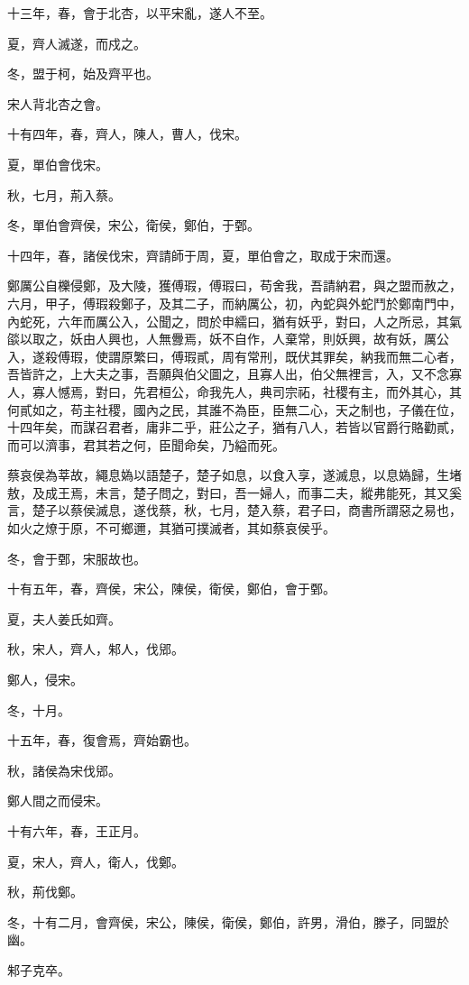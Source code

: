 \begin{pinyinscope}
十三年，春，會于北杏，以平宋亂，遂人不至。

夏，齊人滅遂，而戍之。

冬，盟于柯，始及齊平也。

宋人背北杏之會。

十有四年，春，齊人，陳人，曹人，伐宋。

夏，單伯會伐宋。

秋，七月，荊入蔡。

冬，單伯會齊侯，宋公，衛侯，鄭伯，于鄄。

十四年，春，諸侯伐宋，齊請師于周，夏，單伯會之，取成于宋而還。

鄭厲公自櫟侵鄭，及大陵，獲傅瑕，傅瑕曰，苟舍我，吾請納君，與之盟而赦之，六月，甲子，傅瑕殺鄭子，及其二子，而納厲公，初，內蛇與外蛇鬥於鄭南門中，內蛇死，六年而厲公入，公聞之，問於申繻曰，猶有妖乎，對曰，人之所忌，其氣燄以取之，妖由人興也，人無釁焉，妖不自作，人棄常，則妖興，故有妖，厲公入，遂殺傅瑕，使謂原繁曰，傅瑕貳，周有常刑，既伏其罪矣，納我而無二心者，吾皆許之，上大夫之事，吾願與伯父圖之，且寡人出，伯父無裡言，入，又不念寡人，寡人憾焉，對曰，先君桓公，命我先人，典司宗祏，社稷有主，而外其心，其何貳如之，苟主社稷，國內之民，其誰不為臣，臣無二心，天之制也，子儀在位，十四年矣，而謀召君者，庸非二乎，莊公之子，猶有八人，若皆以官爵行賂勸貳，而可以濟事，君其若之何，臣聞命矣，乃縊而死。

蔡哀侯為莘故，繩息媯以語楚子，楚子如息，以食入享，遂滅息，以息媯歸，生堵敖，及成王焉，未言，楚子問之，對曰，吾一婦人，而事二夫，縱弗能死，其又奚言，楚子以蔡侯滅息，遂伐蔡，秋，七月，楚入蔡，君子曰，商書所謂惡之易也，如火之燎于原，不可鄉邇，其猶可撲滅者，其如蔡哀侯乎。

冬，會于鄄，宋服故也。

十有五年，春，齊侯，宋公，陳侯，衛侯，鄭伯，會于鄄。

夏，夫人姜氏如齊。

秋，宋人，齊人，邾人，伐郳。

鄭人，侵宋。

冬，十月。

十五年，春，復會焉，齊始霸也。

秋，諸侯為宋伐郳。

鄭人間之而侵宋。

十有六年，春，王正月。

夏，宋人，齊人，衛人，伐鄭。

秋，荊伐鄭。

冬，十有二月，會齊侯，宋公，陳侯，衛侯，鄭伯，許男，滑伯，滕子，同盟於幽。

邾子克卒。


\end{pinyinscope}
